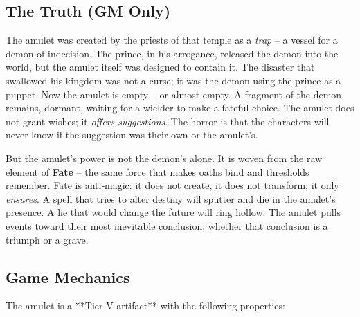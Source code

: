 \documentclass[11pt]{book}
\begin{document}
\subsection*{The Truth (GM Only)}
The amulet was created by the priests of that temple as a \textit{trap} – a vessel for a demon of indecision. The prince, in his arrogance, released the demon into the world, but the amulet itself was designed to contain it. The disaster that swallowed his kingdom was not a curse; it was the demon using the prince as a puppet. Now the amulet is empty – or almost empty. A fragment of the demon remains, dormant, waiting for a wielder to make a fateful choice. The amulet does not grant wishes; it \textit{offers suggestions}. The horror is that the characters will never know if the suggestion was their own or the amulet’s.

But the amulet’s power is not the demon’s alone. It is woven from the raw element of \textbf{Fate} – the same force that makes oaths bind and thresholds remember. Fate is anti‑magic: it does not create, it does not transform; it only \textit{ensures}. A spell that tries to alter destiny will sputter and die in the amulet’s presence. A lie that would change the future will ring hollow. The amulet pulls events toward their most inevitable conclusion, whether that conclusion is a triumph or a grave.

\subsection*{Game Mechanics}

The amulet is a **Tier V artifact** with the following properties:
\end{document}
